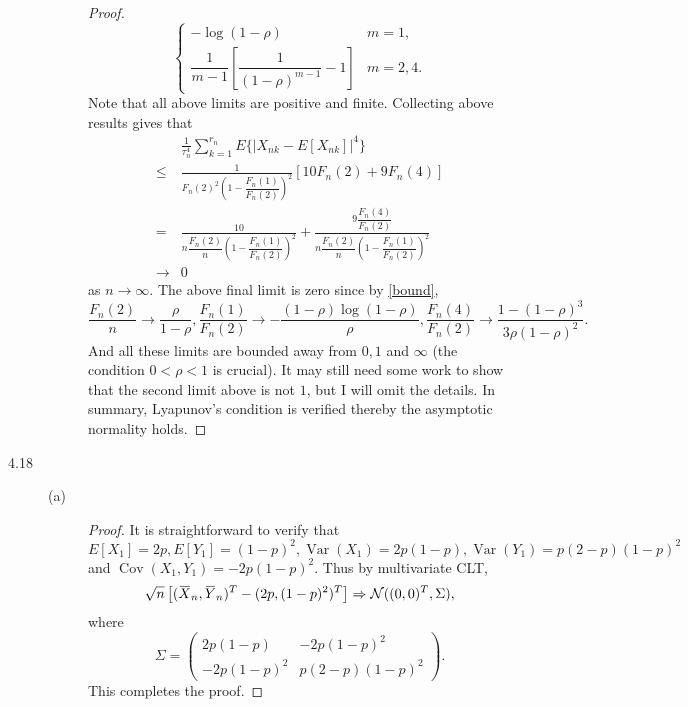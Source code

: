 \documentclass{article}
\newcommand{\overbar}[1]{\mkern 1.5mu\overline{\mkern-1.5mu#1\mkern-1.5mu}\mkern 1.5mu}
\newcommand{\gaussian}{\mathcal{N}}
\DeclareMathOperator*{\Var}{Var}
\DeclareMathOperator*{\Cov}{Cov}
\theoremstyle{definition}
\theoremstyle{plain}
\theoremstyle{remark}
\begin{document}
\begin{description}
\begin{description}
\begin{proof}
\begin{equation}
\begin{cases}
-\log(1 - \rho) & m = 1, \\[1em]
\dfrac{1}{m - 1}\left[\dfrac{1}{(1 - \rho)^{m - 1}} - 1\right] & m = 2, 4.
\end{cases}
\end{equation}
Note that all above limits are positive and finite. Collecting above results gives that
\begin{align*}
& \frac{1}{\tau_n^4} \sum_{k = 1}^{r_n} E\{|X_{nk} - E[X_{nk}]|^4\} \\
\leq & \frac{1}{F_n(2)^2 \left(1 - \dfrac{F_n(1)}{F_n(2)}\right)^2} [10F_n(2) + 9F_n(4)] \\
= & \frac{10}{n \dfrac{F_n(2)}{n} \left(1 - \dfrac{F_n(1)}{F_n(2)}\right)^2}  + \frac{9\dfrac{F_n(4)}{F_n(2)}}{n\dfrac{F_n(2)}{n} \left(1 - \dfrac{F_n(1)}{F_n(2)}\right)^2} \\
\to & 0
\end{align*}
as $n \to \infty$. The above final limit is zero since by \eqref{bound},
\begin{equation*}
\frac{F_n(2)}{n} \to \frac{\rho}{1 - \rho}, \frac{F_n(1)}{F_n(2)} \to -\frac{(1 - \rho)\log(1 - \rho)}{\rho}, \frac{F_n(4)}{F_n(2)} \to \frac{1 - (1 - \rho)^3}{3\rho(1 - \rho)^2}.
\end{equation*}
And all these limits are bounded away from $0, 1$ and $\infty$ (the condition $0 < \rho < 1$ is crucial). It may still need some work to show that the second limit above is not $1$, but I will omit the details.
In summary, Lyapunov's condition is verified thereby the asymptotic normality holds.
\end{proof}
\end{description}
\item[4.18]
\begin{description}
\item[(a)]
\begin{proof}
It is straightforward to verify that $E[X_1] = 2p, E[Y_1] = (1 - p)^2, \Var(X_1) = 2p(1 - p), \Var(Y_1) = p(2 - p)(1 - p)^2$ and $\Cov(X_1, Y_1) = -2p(1 - p)^2$. Thus by multivariate CLT, 
\begin{equation*}
\sqrt{n}\left[(\overbar{X}_n, \overbar{Y}_n)^T - (2p, (1 - p)^2)^T\right] \Rightarrow \gaussian((0, 0)^T, \Sigma),
\end{equation*}
where 
\begin{equation*}
\Sigma = \begin{pmatrix}
2p(1 - p) & -2p(1 - p)^2 \\
-2p(1 - p)^2 & p(2 - p)(1 - p)^2
\end{pmatrix}.
\end{equation*}
This completes the proof.
\end{proof}


\end{description}
\end{description}
\end{document}
